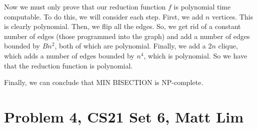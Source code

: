 \documentclass{article}
\begin{document}
Now we must only prove that our reduction function $f$ is polynomial time
computable. To do this, we will consider each step. First, we add $n$ vertices.
This is clearly polynomial. Then, we flip all the edges. So, we get rid of
a constant number of edges (those programmed into the graph) and add a number
of edges bounded by $Bn^2$, both of which are polynomial. Finally, we add a
$2n$ clique, which adds a number of edges bounded by $n^4$, which is polynomial.
So we have that the reduction function is polynomial.

Finally, we can conclude that MIN BISECTION is NP-complete.
\newpage

\section*{Problem 4, CS21 Set 6, Matt Lim}
\end{document}
